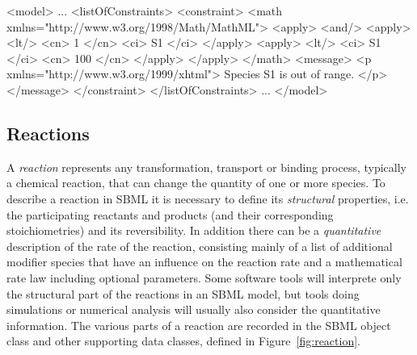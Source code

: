 \begin{example}
<model>
    ...
    <listOfConstraints>
        <constraint>
            <math xmlns="http://www.w3.org/1998/Math/MathML">
                <apply>
                    <and/>
                        <apply> <lt/> <cn> 1 </cn> <ci> S1 </ci> </apply>
                        <apply> <lt/> <ci> S1 </ci> <cn> 100 </cn> </apply>
                </apply>
            </math>
            <message>
                <p xmlns="http://www.w3.org/1999/xhtml"> Species S1 is out of range. </p>
            </message>
        </constraint>
    </listOfConstraints>
    ...
</model>
\end{example}


\subsection{Reactions}
\label{sec:reactions}

A \emph{reaction} represents any transformation, transport or
binding process, typically a chemical reaction, that can change
the quantity of one or more species. 
To describe a reaction in SBML it is necessary to define its \emph{structural}
properties, i.e. the participating reactants and products (and their 
corresponding stoichiometries) and its reversibility. 
In addition there can be a \emph{quantitative} description of the rate of the
reaction, consisting mainly of a list of additional modifier species that 
have an influence on the reaction rate and a mathematical rate law 
including optional parameters.
Some software tools will interprete only the structural part of the reactions
in an SBML model, but tools doing simulations or numerical analysis will
usually also consider the quantitative information.
The various parts of a
reaction are recorded in the SBML \Reaction object class and other
supporting data classes, defined in Figure~\vref{fig:reaction}.

